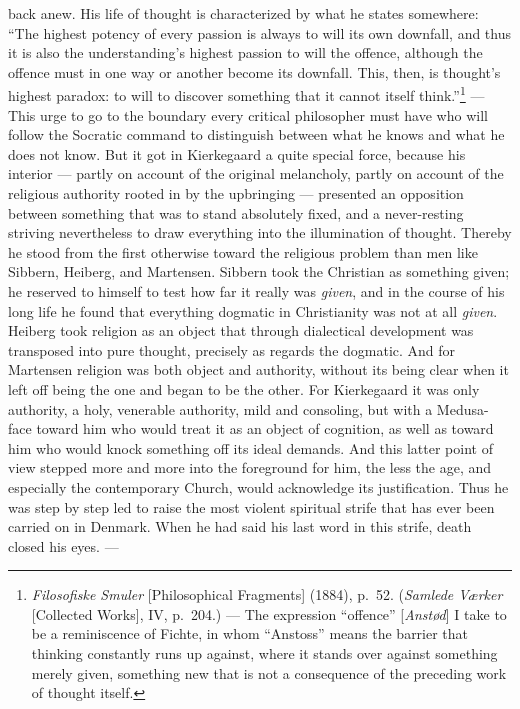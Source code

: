 \documentclass[12pt,a4paper]{book}
\newcommand{\opage}[1]{\marginnote{\footnotesize\textit{[#1]}}}
\begin{document}
back anew. His life of thought is characterized by what he states somewhere: ``The highest
potency of every passion is always to will its own downfall, and thus it is also the
understanding's highest passion to will the offence, although the offence must in one way or
another become its downfall. This, then, is thought's highest paradox: to will to discover
something that it cannot itself think.''\footnote{\emph{Filosofiske Smuler} [Philosophical
Fragments] (1884), p.~52. (\emph{Samlede Værker} [Collected Works], IV, p.~204.) --- The
expression ``offence'' [\emph{Anstød}] I take to be a reminiscence of Fichte, in whom
``Anstoss'' means the barrier that thinking constantly runs up against, where it stands over
against something merely given, something new that is not a consequence of the preceding
work of thought itself.} --- This urge to go to the boundary \opage{150}every critical philosopher must
have who will follow the Socratic command to distinguish between what he knows and what he
does not know. But it got in Kierkegaard a quite special force, because his interior ---
partly on account of the original melancholy, partly on account of the religious authority
rooted in by the upbringing --- presented an opposition between something that was to stand
absolutely fixed, and a never-resting striving nevertheless to draw everything into the
illumination of thought. Thereby he stood from the first otherwise toward the religious
problem than men like Sibbern, Heiberg, and Martensen. Sibbern took the Christian as
something given; he reserved to himself to test how far it really was \emph{given}, and in
the course of his long life he found that everything dogmatic in Christianity was not at all
\emph{given}. Heiberg took religion as an object that through dialectical development was
transposed into pure thought, precisely as regards the dogmatic. And for Martensen religion
was both object and authority, without its being clear when it left off being the one and
began to be the other. For Kierkegaard it was only authority, a holy, venerable authority,
mild and consoling, but with a Medusa-face toward him who would treat it as an object of
cognition, as well as toward him who would knock something off its ideal demands. And this
latter point of view stepped more and more into the foreground for him, the less the age,
and especially the contemporary Church, would acknowledge its justification. Thus he was
step by step led to raise the most violent spiritual strife that has ever been carried on in
Denmark. When he had said his last word in this strife, death closed his eyes. ---
\end{document}
